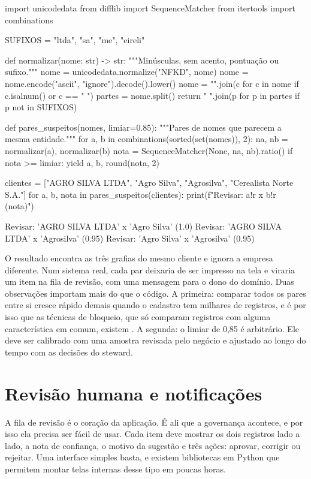 \begin{python}
import unicodedata
from difflib import SequenceMatcher
from itertools import combinations

SUFIXOS = {"ltda", "sa", "me", "eireli"}

def normalizar(nome: str) -> str:
    """Minúsculas, sem acento, pontuação ou sufixo."""
    nome = unicodedata.normalize("NFKD", nome)
    nome = nome.encode("ascii", "ignore").decode().lower()
    nome = "".join(c for c in nome if c.isalnum() or c == " ")
    partes = nome.split()
    return " ".join(p for p in partes if p not in SUFIXOS)

def pares_suspeitos(nomes, limiar=0.85):
    """Pares de nomes que parecem a mesma entidade."""
    for a, b in combinations(sorted(set(nomes)), 2):
        na, nb = normalizar(a), normalizar(b)
        nota = SequenceMatcher(None, na, nb).ratio()
        if nota >= limiar:
            yield a, b, round(nota, 2)

clientes = ["AGRO SILVA LTDA", "Agro Silva", "Agrosilva",
            "Cerealista Norte S.A."]
for a, b, nota in pares_suspeitos(clientes):
    print(f"Revisar: {a!r} x {b!r} ({nota})")
\end{python}

\begin{terminal}
Revisar: 'AGRO SILVA LTDA' x 'Agro Silva' (1.0)
Revisar: 'AGRO SILVA LTDA' x 'Agrosilva' (0.95)
Revisar: 'Agro Silva' x 'Agrosilva' (0.95)
\end{terminal}

O resultado encontra as três grafias do mesmo cliente e ignora a empresa diferente. Num
sistema real, cada par deixaria de ser impresso na tela e viraria um item na fila de revisão,
com uma mensagem para o dono do domínio. Duas observações importam mais do que o código. A
primeira: comparar todos os pares entre si cresce rápido demais quando o cadastro tem
milhares de registros, e é por isso que as técnicas de bloqueio, que só comparam registros
com alguma característica em comum, existem \parencite{christen2012}. A segunda: o limiar
de 0,85 é arbitrário. Ele deve ser calibrado com uma amostra revisada pelo negócio e
ajustado ao longo do tempo com as decisões do steward.

\section{Revisão humana e notificações}
\label{sec:revisao-notificacao}

A fila de revisão é o coração da aplicação. É ali que a governança acontece, e por isso ela
precisa ser fácil de usar. Cada item deve mostrar os dois registros lado a lado, a nota de
confiança, o motivo da sugestão e três ações: aprovar, corrigir ou rejeitar. Uma interface
simples basta, e existem bibliotecas em Python que permitem montar telas internas desse tipo
em poucas horas.

